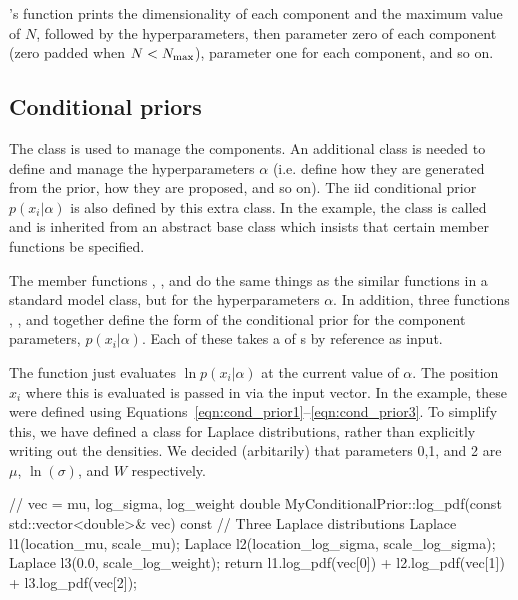 \documentclass[article, nojss]{jss}
\begin{document}
's  function prints the dimensionality of each
component and the maximum value of $N$, followed by the hyperparameters,
then parameter zero of each component (zero padded when $N<N_{\rm max}$),
parameter one for each component, and so on.

\subsection{Conditional priors}
The  class is used to manage the components. An additional
class is needed to define and manage the hyperparameters $\alpha$ (i.e.
define how they are generated from the prior, how they are proposed, and
so on). The iid
conditional prior $p(x_i | \alpha)$ is also defined by this extra class.
In the example, the class is called  and
is inherited from an abstract base class 
which insists that certain member functions be specified.

The member functions , , and
 do the same things as the similar functions in a standard model
class, but for the hyperparameters $\alpha$. 
In addition, three functions
, , and 
together define the form of the conditional prior for the
component parameters, $p(x_i | \alpha)$. Each of these takes a
 of s by reference as input.

The  function just evaluates $\ln p(x_i | \alpha)$
at the current value of $\alpha$. The position $x_i$ where this is evaluated
is passed in via the input vector. In the example, these
were defined using Equations~\ref{eqn:cond_prior1}--\ref{eqn:cond_prior3}.
To simplify this, we have defined a class for Laplace distributions,
rather than explicitly writing out the densities. We decided (arbitarily)
that parameters 0,1, and 2 are $\mu$, $\ln(\sigma)$, and $W$ respectively.
\begin{CodeChunk}
\begin{CodeInput}
// vec = {mu, log_sigma, log_weight}
double MyConditionalPrior::log_pdf(const std::vector<double>& vec) const
{
    // Three Laplace distributions
    Laplace l1(location_mu, scale_mu);
    Laplace l2(location_log_sigma, scale_log_sigma);
    Laplace l3(0.0, scale_log_weight);
    return l1.log_pdf(vec[0]) + l2.log_pdf(vec[1]) + l3.log_pdf(vec[2]);
}
\end{CodeInput}
\end{CodeChunk}
\end{document}
